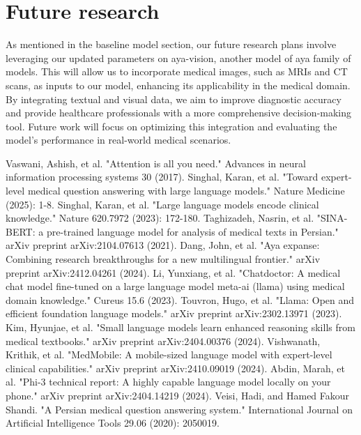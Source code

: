 \documentclass[conference]{IEEEtran}
\begin{document}
	\section*{Future research}
	As mentioned in the baseline model section, our future research plans involve leveraging our updated parameters on aya-vision, another model of aya family of models. This will allow us to incorporate medical images, such as MRIs and CT scans, as inputs to our model, enhancing its applicability in the medical domain. By integrating textual and visual data, we aim to improve diagnostic accuracy and provide healthcare professionals with a more comprehensive decision-making tool. Future work will focus on optimizing this integration and evaluating the model’s performance in real-world medical scenarios.
	
	
	\begin{thebibliography}{00}
		Vaswani, Ashish, et al. "Attention is all you need." Advances in neural information processing systems 30 (2017).
		Singhal, Karan, et al. "Toward expert-level medical question answering with large language models." Nature Medicine (2025): 1-8.
		Singhal, Karan, et al. "Large language models encode clinical knowledge." Nature 620.7972 (2023): 172-180.
		Taghizadeh, Nasrin, et al. "SINA-BERT: a pre-trained language model for analysis of medical texts in Persian." arXiv preprint arXiv:2104.07613 (2021).
		Dang, John, et al. "Aya expanse: Combining research breakthroughs for a new multilingual frontier." arXiv preprint arXiv:2412.04261 (2024).
		Li, Yunxiang, et al. "Chatdoctor: A medical chat model fine-tuned on a large language model meta-ai (llama) using medical domain knowledge." Cureus 15.6 (2023).
		Touvron, Hugo, et al. "Llama: Open and efficient foundation language models." arXiv preprint arXiv:2302.13971 (2023).
		Kim, Hyunjae, et al. "Small language models learn enhanced reasoning skills from medical textbooks." arXiv preprint arXiv:2404.00376 (2024).
		Vishwanath, Krithik, et al. "MedMobile: A mobile-sized language model with expert-level clinical capabilities." arXiv preprint arXiv:2410.09019 (2024).
		Abdin, Marah, et al. "Phi-3 technical report: A highly capable language model locally on your phone." 
		arXiv preprint arXiv:2404.14219 (2024).
		Veisi, Hadi, and Hamed Fakour Shandi. "A Persian medical question answering system." International Journal on Artificial Intelligence Tools 29.06 (2020): 2050019. 

\end{thebibliography}
\end{document}

